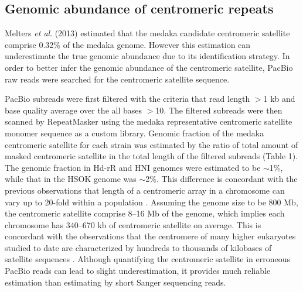 \subsection*{Genomic abundance of centromeric repeats}
Melters \textit{et al}. (2013) estimated that the medaka candidate centromeric satellite comprise 0.32\% of the medaka genome. However this estimation can underestimate the true genomic abundance due to its identification strategy. In order to better infer the genomic abundance of the centromeric satellite, PacBio raw reads were searched for the centromeric satellite sequence.

PacBio subreads were first filtered with the criteria that read length $>$1 kb and base quality average over the all bases $>$10. The filtered subreads were then scanned by RepeatMasker using the medaka representative centromeric satellite monomer sequence as a custom library. Genomic fraction of the medaka centromeric satellite for each strain was estimated by the ratio of total amount of masked centromeric satellite in the total length of the filtered subreads (Table 1). The genomic fraction in Hd-rR and HNI genomes were estimated to be $\sim$1\%, while that in the HSOK genome was $\sim$2\%. This difference is concordant with the previous observations that length of a centromeric array in a chromosome can vary up to 20-fold within a population \cite{Miga}. Assuming the genome size to be 800 Mb, the centromeric satellite comprise 8--16 Mb of the genome, which implies each chromosome has 340--670 kb of centromeric satellite on average. This is concordant with the observations that the centromere of many higher eukaryotes studied to date are characterized by hundreds to thousands of kilobases of satellite sequences \cite{Plohl}. Although quantifying the centromeric satellite in erroneous PacBio reads can lead to slight underestimation, it provides much reliable estimation than estimating by short Sanger sequencing reads.


